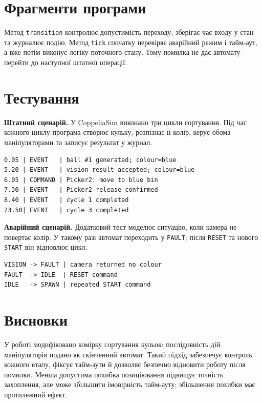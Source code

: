 \documentclass[12pt,a4paper]{article}
\begin{document}
\section{Фрагменти програми}
Метод \texttt{transition} контролює допустимість переходу, зберігає час
входу у стан та журналює подію. Метод \texttt{tick} спочатку перевіряє
аварійний режим і тайм-аут, а вже потім виконує логіку поточного стану.
Тому помилка не дає автомату перейти до наступної штатної операції.


\Needspace{0.4\textheight}


\section{Тестування}
\textbf{Штатний сценарій.} У CoppeliaSim виконано три цикли сортування.
Під час кожного циклу програма створює кульку, розпізнає її колір,
керує обома маніпуляторами та записує результат у журнал.
\begin{lstlisting}[caption={Фрагмент журналу штатного виконання}]
0.05 | EVENT   | ball #1 generated; colour=blue
5.20 | EVENT   | vision result accepted; colour=blue
6.05 | COMMAND | Picker2: move to blue bin
7.30 | EVENT   | Picker2 release confirmed
8.40 | EVENT   | cycle 1 completed
23.50| EVENT   | cycle 3 completed
\end{lstlisting}

\textbf{Аварійний сценарій.} Додатковий тест моделює ситуацію, коли камера
не повертає колір. У такому разі автомат переходить у \texttt{FAULT};
після \texttt{RESET} та нового \texttt{START} він відновлює цикл.
\begin{lstlisting}[caption={Результат тесту відновлення}]
VISION -> FAULT | camera returned no colour
FAULT  -> IDLE  | RESET command
IDLE   -> SPAWN | repeated START command
\end{lstlisting}

\section{Висновки}
У роботі модифіковано комірку сортування кульок: послідовність дій
маніпуляторів подано як скінченний автомат. Такий підхід забезпечує
контроль кожного етапу, фіксує тайм-аути й дозволяє безпечно відновити
роботу після помилки. Менша допустима похибка позиціювання підвищує
точність захоплення, але може збільшити імовірність тайм-ауту; збільшення
похибки має протилежний ефект.
\end{document}

